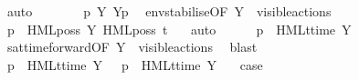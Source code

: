 \begin{isabellebody}
\ auto\isanewline
\isanewline
\ \ \ \ \isamarkupfalse%
\ \isamarkupfalse%
\ {\isacartoucheopen}{\isasymtheta}{\isacharparenleft}{\kern0pt}p{\isacharparenright}{\kern0pt}\ {\isasymlongmapsto}\isactrlsup {\isasymtheta}{\isasymepsilon}{\isacharbrackleft}{\kern0pt}Y{\isacharbrackright}{\kern0pt}\ {\isasymtheta}{\isacharbrackleft}{\kern0pt}Y{\isacharbrackright}{\kern0pt}{\isacharparenleft}{\kern0pt}p{\isacharparenright}{\kern0pt}{\isacartoucheclose}\ \isamarkupfalse%
\ env{\isacharunderscore}{\kern0pt}stabilise{\isacharbrackleft}{\kern0pt}OF\ {\isacartoucheopen}Y\ {\isasymsubseteq}\ visible{\isacharunderscore}{\kern0pt}actions{\isacartoucheclose}{\isacharbrackright}{\kern0pt}\ \isacommand{{\isachardot}{\kern0pt}}\isamarkupfalse%
\isanewline
\ \ \ \ \isamarkupfalse%
\ \isamarkupfalse%
\ {\isacartoucheopen}{\isasymtheta}{\isacharparenleft}{\kern0pt}p{\isacharparenright}{\kern0pt}\ {\isasymTurnstile}\ HML{\isacharunderscore}{\kern0pt}poss\ {\isacharparenleft}{\kern0pt}{\isasymepsilon}{\isacharbrackleft}{\kern0pt}Y{\isacharbrackright}{\kern0pt}{\isacharparenright}{\kern0pt}\ {\isacharparenleft}{\kern0pt}HML{\isacharunderscore}{\kern0pt}poss\ t\ {\isasymsigma}{\isacharparenleft}{\kern0pt}{\isasymphi}{\isacharparenright}{\kern0pt}{\isacharparenright}{\kern0pt}{\isacartoucheclose}\ \isamarkupfalse%
\ auto\isanewline
\isanewline
\ \ \ \ \isamarkupfalse%
\ {\isacartoucheopen}{\isasymtheta}{\isacharparenleft}{\kern0pt}p{\isacharparenright}{\kern0pt}\ {\isasymTurnstile}\ {\isasymsigma}{\isacharparenleft}{\kern0pt}HMLt{\isacharunderscore}{\kern0pt}time\ Y\ {\isasymphi}{\isacharparenright}{\kern0pt}{\isacartoucheclose}\ \isamarkupfalse%
\ sat{\isacharunderscore}{\kern0pt}time{\isacharunderscore}{\kern0pt}forward{\isacharbrackleft}{\kern0pt}OF\ {\isacartoucheopen}Y\ {\isasymsubseteq}\ visible{\isacharunderscore}{\kern0pt}actions{\isacartoucheclose}{\isacharbrackright}{\kern0pt}\ \isamarkupfalse%
\ blast\isanewline
\ \ \isamarkupfalse%
\isanewline
\ \ \ \ \isamarkupfalse%
\ {\isacartoucheopen}{\isasymtheta}{\isacharparenleft}{\kern0pt}p{\isacharparenright}{\kern0pt}\ {\isasymTurnstile}\ {\isasymsigma}{\isacharparenleft}{\kern0pt}HMLt{\isacharunderscore}{\kern0pt}time\ Y\ {\isasymphi}{\isacharparenright}{\kern0pt}\ {\isasymLongrightarrow}\ p\ {\isasymTTurnstile}\ HMLt{\isacharunderscore}{\kern0pt}time\ Y\ {\isasymphi}{\isacartoucheclose}\ \isamarkupfalse%
\ case{}\ \isacommand{{\isachardot}{\kern0pt}}\isamarkupfalse%

\end{isabellebody}

